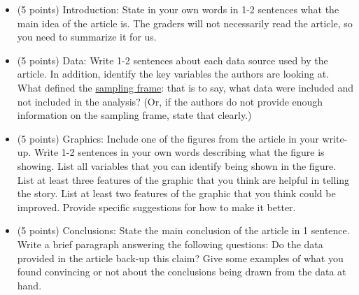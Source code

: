 \documentclass{article}\usepackage[]{graphicx}\usepackage[]{color}
\begin{document}
\begin{itemize}
    \item (5 points) Introduction: State in your own words in 1-2 sentences what the main idea of the article is. The graders will not necessarily read the article, so you need to summarize it for us.
    \item (5 points) Data: Write 1-2 sentences about each data source used by the article. In addition, identify the key variables the authors are looking at. What defined the \href{https://en.wikipedia.org/wiki/Sampling_frame}{sampling frame}: that is to say, what data were included and not included in the analysis? (Or, if the authors do not provide enough information on the sampling frame, state that clearly.) 
    \item (5 points) Graphics: Include one of the figures from the article in your write-up. Write 1-2 sentences in your own words describing what the figure is showing. List all variables that you can identify being shown in the figure. List at least three features of the graphic that you think are helpful in telling the story. List at least two features of the graphic that you think could be improved. Provide specific suggestions for how to make it better.
    \item (5 points) Conclusions: State the main conclusion of the article in 1 sentence. Write a brief paragraph answering the following questions: Do the data provided in the article back-up this claim? Give some examples of what you found convincing or not about the conclusions being drawn from the data at hand.
\end{itemize}
\end{document}
